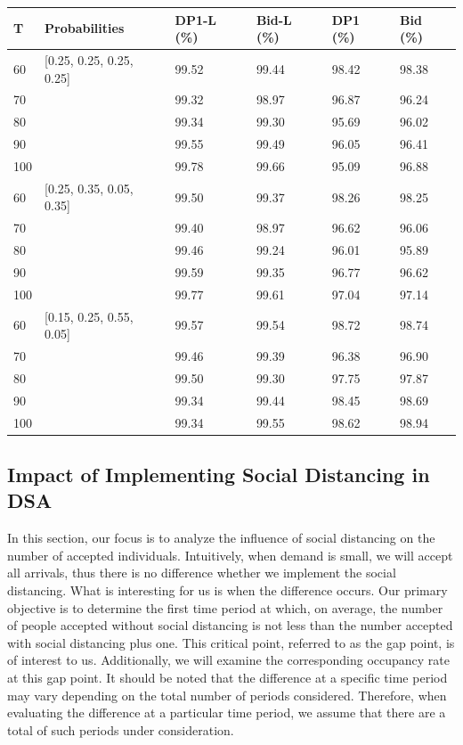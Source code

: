 \begin{table}[ht]
  \centering
  \begin{tabular}{|l|l|l|l|l|l|}
  \hline
   T & Probabilities &  DP1-L (\%) & Bid-L (\%) & DP1 (\%) & Bid (\%) \\
  \hline
  60  & [0.25, 0.25, 0.25, 0.25]  & 99.52 & 99.44 & 98.42 & 98.38 \\
  70  &   & 99.32 & 98.97 & 96.87 & 96.24 \\
  80  &   & 99.34 & 99.30 & 95.69 & 96.02 \\
  90  &   & 99.55 & 99.49 & 96.05 & 96.41  \\
  100 &   & 99.78 & 99.66 & 95.09 & 96.88 \\
  \hline
  60  & [0.25, 0.35, 0.05, 0.35]  & 99.50 & 99.37 & 98.26 & 98.25  \\
  70  &   & 99.40 & 98.97 & 96.62 & 96.06 \\
  80  &   & 99.46 & 99.24 & 96.01 & 95.89 \\
  90  &   & 99.59 & 99.35 & 96.77 & 96.62 \\
  100 &   & 99.77 & 99.61 & 97.04 & 97.14  \\
  \hline
  60  & [0.15, 0.25, 0.55, 0.05]  & 99.57 & 99.54 & 98.72 & 98.74 \\
  70  &   & 99.46 & 99.39  & 96.38 & 96.90 \\
  80  &   & 99.50 & 99.30  & 97.75 & 97.87 \\
  90  &   & 99.34 & 99.44  & 98.45 & 98.69 \\
  100 &   & 99.34 & 99.55  & 98.62 & 98.94 \\
  \hline
  \end{tabular}
\end{table}


\subsection{Impact of Implementing Social Distancing in DSA}
In this section, our focus is to analyze the influence of social distancing on the number of accepted individuals. Intuitively, when demand is small, we will accept all arrivals, thus there is no difference whether we implement the social distancing. What is interesting for us is when the difference occurs. Our primary objective is to determine the first time period at which, on average, the number of people accepted without social distancing is not less than the number accepted with social distancing plus one. This critical point, referred to as the gap point, is of interest to us. Additionally, we will examine the corresponding occupancy rate at this gap point. It should be noted that the difference at a specific time period may vary depending on the total number of periods considered. Therefore, when evaluating the difference at a particular time period, we assume that there are a total of such periods under consideration.


